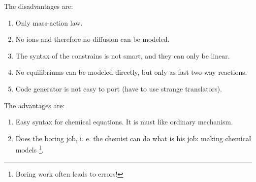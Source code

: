 The disadvantages are:
\begin{enumerate}
 \item Only mass-action law.
 \item No ions and therefore no diffusion can be modeled.
 \item The syntax of the constrains is not smart, and they can only be linear.
 \item No equilibriums can be modeled directly, but only as fast two-way reactions.
 \item Code generator is not easy to port (have to use strange translators).
\end{enumerate}

The advantages are:
\begin{enumerate}
 \item Easy syntax for chemical equations. It is must like ordinary mechanism. 
 \item Does the boring job, i. e. the chemist can do what is his job: making
       chemical models \footnote{Boring work often leads to errors!}.
\end{enumerate}

